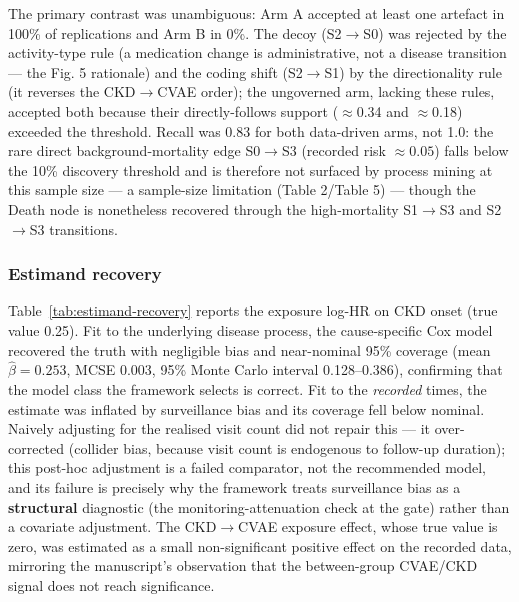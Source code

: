 \documentclass[sn-vancouver-num]{sn-jnl}
\begin{document}
The primary contrast was unambiguous: Arm A accepted at least one artefact in 100\% of replications and Arm B in 0\%. The decoy (S2$\rightarrow$S0) was rejected by the activity-type rule (a medication change is administrative, not a disease transition --- the Fig. 5 rationale) and the coding shift (S2$\rightarrow$S1) by the directionality rule (it reverses the CKD$\rightarrow$CVAE order); the ungoverned arm, lacking these rules, accepted both because their directly-follows support ($\approx$0.34 and $\approx$0.18) exceeded the threshold. Recall was 0.83 for both data-driven arms, not 1.0: the rare direct background-mortality edge S0$\rightarrow$S3 (recorded risk $\approx 0.05$) falls below the 10\% discovery threshold and is therefore not surfaced by process mining at this sample size --- a sample-size limitation (Table 2/Table 5) --- though the Death node is nonetheless recovered through the high-mortality S1$\rightarrow$S3 and S2$\rightarrow$S3 transitions.

\subsubsection{Estimand recovery}
Table~\ref{tab:estimand-recovery} reports the exposure log-HR on CKD onset (true value 0.25). Fit to the underlying disease process, the cause-specific Cox model recovered the truth with negligible bias and near-nominal 95\% coverage (mean $\hat{\beta} = 0.253$, MCSE 0.003, 95\% Monte Carlo interval 0.128--0.386), confirming that the model class the framework selects is correct. Fit to the \textit{recorded} times, the estimate was inflated by surveillance bias and its coverage fell below nominal. Naively adjusting for the realised visit count did not repair this --- it over-corrected (collider bias, because visit count is endogenous to follow-up duration); this post-hoc adjustment is a failed comparator, not the recommended model, and its failure is precisely why the framework treats surveillance bias as a \textbf{structural} diagnostic (the monitoring-attenuation check at the gate) rather than a covariate adjustment. The CKD$\rightarrow$CVAE exposure effect, whose true value is zero, was estimated as a small non-significant positive effect on the recorded data, mirroring the manuscript's observation that the between-group CVAE/CKD signal does not reach significance.
\end{document}
